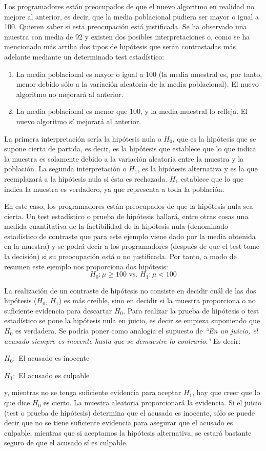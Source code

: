 Los programadores están preocupados de que el nuevo algoritmo en realidad no mejore al anterior, es decir, que
la media poblacional pudiera ser mayor o igual a 100. Quieren saber si esta preocupación está justificada. Se ha
observado una muestra con media de 92 y existen dos posibles interpretaciones o, como se ha mencionado más arriba
dos tipos de hipótesis que serán contrastadas más adelante mediante un determinado test estadístico:
\begin{enumerate}
\item La media poblacional es mayor o igual a 100 (la media muestral es, por tanto, menor debido sólo a la
variación aleatoria de la media poblacional). El nuevo algoritmo no mejorará al anterior.
\item La media poblacional es menor que 100, y la media muestral lo refleja. El nuevo algoritmo sí mejorará
al anterior.
\end{enumerate}
La primera interpretación sería la hipótesis nula o $H_0$, que es la hipótesis que se supone cierta de partida, es
decir, es la hipótesis que establece que lo que indica la muestra es solamente debido a la variación aleatoria entre
la muestra y la población. La segunda interpretación o $H_1$, es la hipótesis alternativa y es la que reemplazará a
la hipótesis nula si ésta es rechazada. $H_1$ establece que lo que indica la muestra es verdadero, ya que representa
a toda la población.

En este caso, los programadores están preocupados de que la hipótesis nula sea cierta. Un test estadístico o prueba
de hipótesis hallará, entre otras cosas  una medida cuantitativa de la factibilidad de la hipótesis nula (denominado estadístico de contraste que para este ejemplo viene dado por la media obtenida en la muestra) y se podrá decir a los programadores (después de que el test tome la decisión) si su preocupación está o no justificada. Por tanto, a modo
de resumen este ejemplo nos proporciona dos hipótesis:
$$H_0: \mu \geq 100 \mbox{ vs. } H_1: \mu < 100$$

La realización de un contraste de hipótesis no consiste en decidir cuál de las dos hipótesis ($H_0$, $H_1$) es más
creíble, sino en decidir si la muestra proporciona o no suficiente evidencia para descartar $H_0$. Para realizar la
prueba de hipótesis o test estadístico se pone la hipótesis nula en juicio, es decir se empieza suponiendo que $H_0$
es verdadera. Se podría poner como analogía el supuesto de \textit{``En un juicio, el acusado siempre es inocente
hasta que se demuestre lo contrario."} Es decir:
\begin{center}
$H_0:$ El acusado es inocente

$H_1:$ El acusado es culpable
\end{center}
y, mientras no se tenga suficiente evidencia para aceptar $H_1$, hay que creer que lo que dice $H_0$ es cierto. La
muestra aleatoria proporcionará la evidencia. Si el juicio (test o prueba de hipótesis) determina que el acusado
es inocente, sólo se puede decir que no se tiene suficiente evidencia para asegurar que el acusado es culpable,
mientras que si aceptamos la hipótesis alternativa, se estará bastante seguro de que el acusado sí es culpable.

